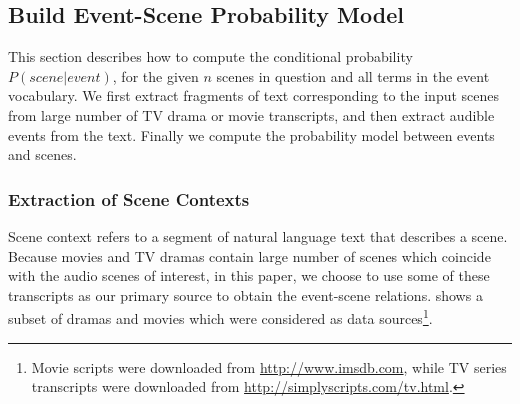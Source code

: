\subsection{Build Event-Scene Probability Model}
\label{sec:mapping}
This section describes how to compute the conditional probability 
$P(scene | event)$, for the given $n$ scenes in question and all 
terms in the event vocabulary. We first extract fragments of text
corresponding to the input scenes 
from large number of TV drama or movie transcripts, and then extract
audible events from the text. Finally we compute the probability model
between events and scenes. 

\subsubsection{Extraction of Scene Contexts}
Scene context refers to a segment of natural language text that describes 
a scene.
Because movies and TV dramas contain large number of scenes which
coincide with the audio scenes of interest, in this paper, we
choose to use some of these transcripts as our primary source to obtain
the event-scene relations.  shows a subset of
dramas and movies which were considered as data sources\footnote{Movie
scripts were downloaded from \url{http://www.imsdb.com},
while TV series transcripts were downloaded from \url{http://simplyscripts.com/tv.html}.}. 


